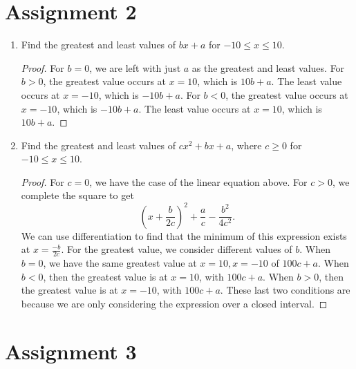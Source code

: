 \documentclass[10pt]{article}
\theoremstyle{definition}
\theoremstyle{remark}
\begin{document}
\section*{Assignment 2}

\begin{enumerate}[label=(\roman*)]
    \item Find the greatest and least values of $bx + a$ for $-10 \leq x \leq 10$.
        \begin{proof}
            For $b = 0$, we are left with just $a$ as the greatest and least values.
            For $b > 0$, the greatest value occurs at $x = 10$, which is $10b + a$.
            The least value occurs at $x = -10$, which is $-10b + a$.
            For $b < 0$, the greatest value occurs at $x = -10$, which is $-10b + a$.
            The least value occurs at $x = 10$, which is $10b + a$.
        \end{proof}
    \item Find the greatest and least values of $cx^2 + bx + a$, where $c \geq 0$
        for $-10 \leq x \leq 10$.
        \begin{proof}
            For $c = 0$, we have the case of the linear equation above.
            For $c > 0$, we complete the square to get
            \[ \left( x + \frac{b}{2c}\right)^2 + \frac{a}{c} - \frac{b^2}{4c^2}. \]
            We can use differentiation to find that the minimum of this expression 
            exists at $x = \frac{-b}{2c}$. 
            For the greatest value, we consider different values of $b$. When
            $b = 0$, we have the same greatest value at $x = 10, x = -10$ of 
            $100c + a$. When $b < 0$, then the greatest value is at $x = 10$, with 
            $100c + a$. When $b > 0$, then the greatest value is at $x = -10$, with 
            $100c + a$. These last two conditions are because we are only considering
            the expression over a closed interval. 
        \end{proof}
\end{enumerate}

\section*{Assignment 3} 
\end{document}

